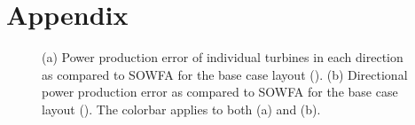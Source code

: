 \documentclass[conf]{new-aiaa}
\begin{document}
\section*{Appendix}
\begin{figure}[ht]
	\centering
	\caption{(a) Power production error of individual turbines in each direction as compared to SOWFA for the base case layout (). (b) Directional power production error as compared to SOWFA for the base case layout ().  The colorbar applies to both (a) and (b).}
	\label{fig:basecase-power-error}
\end{figure}
\end{document}
